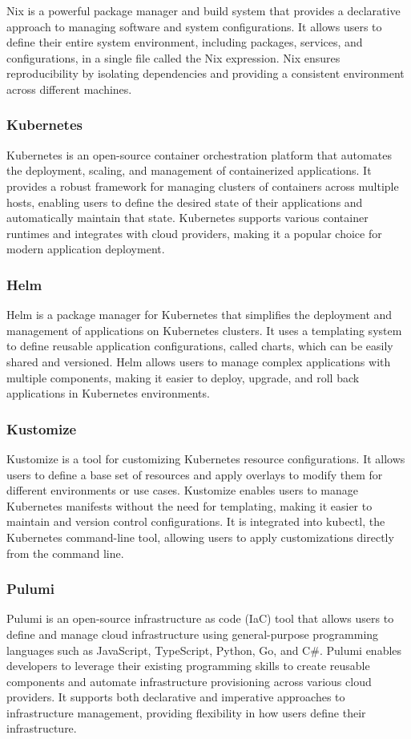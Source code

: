 Nix is a powerful package manager and build system that provides a declarative approach to managing software and system configurations. It allows users to define their entire system environment, including packages, services, and configurations, in a single file called the Nix expression. Nix ensures reproducibility by isolating dependencies and providing a consistent environment across different machines.

\subsubsection{Kubernetes}
\label{sec:kubernetes}
Kubernetes is an open-source container orchestration platform that automates the deployment, scaling, and management of containerized applications. It provides a robust framework for managing clusters of containers across multiple hosts, enabling users to define the desired state of their applications and automatically maintain that state. Kubernetes supports various container runtimes and integrates with cloud providers, making it a popular choice for modern application deployment.

\subsubsection{Helm}
\label{sec:helm}
Helm is a package manager for Kubernetes that simplifies the deployment and management of applications on Kubernetes clusters. It uses a templating system to define reusable application configurations, called charts, which can be easily shared and versioned. Helm allows users to manage complex applications with multiple components, making it easier to deploy, upgrade, and roll back applications in Kubernetes environments.

\subsubsection{Kustomize}
\label{sec:kustomize}
Kustomize is a tool for customizing Kubernetes resource configurations. It allows users to define a base set of resources and apply overlays to modify them for different environments or use cases. Kustomize enables users to manage Kubernetes manifests without the need for templating, making it easier to maintain and version control configurations. It is integrated into kubectl, the Kubernetes command-line tool, allowing users to apply customizations directly from the command line.

\subsubsection{Pulumi}
\label{sec:pulumi}
Pulumi is an open-source infrastructure as code (IaC) tool that allows users to define and manage cloud infrastructure using general-purpose programming languages such as JavaScript, TypeScript, Python, Go, and C\#. Pulumi enables developers to leverage their existing programming skills to create reusable components and automate infrastructure provisioning across various cloud providers. It supports both declarative and imperative approaches to infrastructure management, providing flexibility in how users define their infrastructure.

